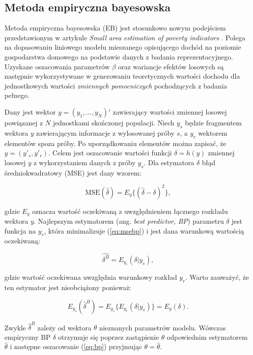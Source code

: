 \subsection{Metoda empiryczna bayesowska}

Metoda empiryczna bayesowska (EB) jest stosunkowo nowym podejściem przedstawionym w artykule \textit{Small area estimation of poverty indicators} \citep{ebp2010}. Polega na dopasowaniu liniowego modelu mieszanego opisującego dochód na poziomie gospodarstwa domowego na podstawie danych z badania reprezentacyjnego. Uzyskane oszacowania parametrów $\beta$ oraz wariancje efektów losowych są następnie wykorzystywane w generowaniu teoretycznych wartości dochodu dla jednostkowych wartości \textit{zmiennych pomocniczych} pochodzących z badania pełnego.

Dany jest wektor $y=(y_1,...,y_N)'$ zawierający wartości zmiennej losowej powiązanej z $N$ jednostkami skończonej populacji. Niech $y_s$ będzie fragmentem wektora $y$ zawierającym informacje z wylosowanej próby $s$, a $y_r$ wektorem elementów spoza próby. Po uporządkowaniu elementów można zapisać, że $y=(y'_s, y'_r)$. Celem jest oszacowanie wartości funkcji $\delta=h(y)$ zmiennej losowej $y$ z wykorzystaniem danych z próby $y_s$. Dla estymatora $\delta$ błąd średniokwadratowy (MSE) jest dany wzorem:

\begin{equation}
\text{MSE}(\hat{\delta})=E_y\{(\hat{\delta}-\delta)^2\},
\label{eq:msebp}
\end{equation}

gdzie $E_y$ oznacza wartość oczekiwaną z uwzględnieniem łącznego rozkładu wektora $y$. Najlepszym estymatorem (ang. \textit{best predictor, BP}) parametru $\delta$ jest funkcja na $y_s$, która minimalizuje (\ref{eq:msebp}) i jest dana warunkową wartością oczekiwaną:

\begin{equation}
\hat{\delta^{B}}=E_{y_{r}}(\delta|y_s),
\label{eq:bp}
\end{equation}

gdzie wartość oczekiwana uwzględnia warunkowy rozkład $y_r$. Warto zauważyć, że ten estymator jest nieobciążony ponieważ:

\begin{equation}
E_{y_{s}}(\hat{\delta}^B)=E_{y_{s}}\{E_{y_{r}}(\delta|y_s)\}=E_y(\delta).
\end{equation}

Zwykle $\hat{\delta}^B$ zależy od wektora $\theta$ nieznanych parametrów modelu. Wówczas empiryczny BP $\delta$ otrzymuje się poprzez zastąpienie $\theta$ odpowiednim estymatorem $\hat{\theta}$ i następne oszacowanie (\ref{eq:bp}) przyjmując $\theta=\hat{\theta}$.


